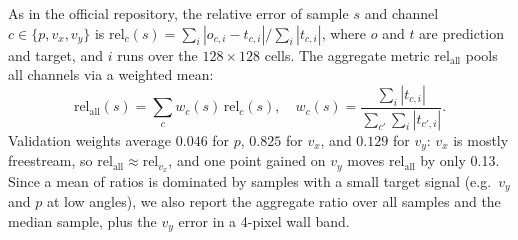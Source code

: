 \documentclass[conference]{IEEEtran}
\newcommand{\relall}{$\mathrm{rel}_{\mathrm{all}}$}
\begin{document}
As in the official repository, the relative error of sample $s$ and channel
$c \in \{p, v_x, v_y\}$ is $\mathrm{rel}_c(s) = \sum_i|o_{c,i}-t_{c,i}| /
\sum_i|t_{c,i}|$, where $o$ and $t$ are prediction and target, and $i$ runs over
the $128\times128$ cells. The aggregate metric \relall{}
pools all channels via a weighted mean:
\begin{equation}
  \mathrm{rel}_{\mathrm{all}}(s) = \sum_c w_c(s)\,\mathrm{rel}_c(s), \quad
  w_c(s) = \frac{\sum_i|t_{c,i}|}{\sum_{c'}\sum_i|t_{c',i}|}.
  \label{eq:relall}
\end{equation}
Validation weights average $0.046$ for $p$, $0.825$ for $v_x$, and $0.129$
for $v_y$: $v_x$ is mostly freestream, so $\mathrm{rel}_{\mathrm{all}} \approx
\mathrm{rel}_{v_x}$, and one point gained on $v_y$ moves \relall{} by only
0.13. Since a mean of ratios is
dominated by samples with a small target signal (e.g.\ $v_y$ and $p$ at
low angles), we also report the aggregate ratio over all samples and the
median sample, plus the $v_y$ error in a 4-pixel wall band.
\end{document}
